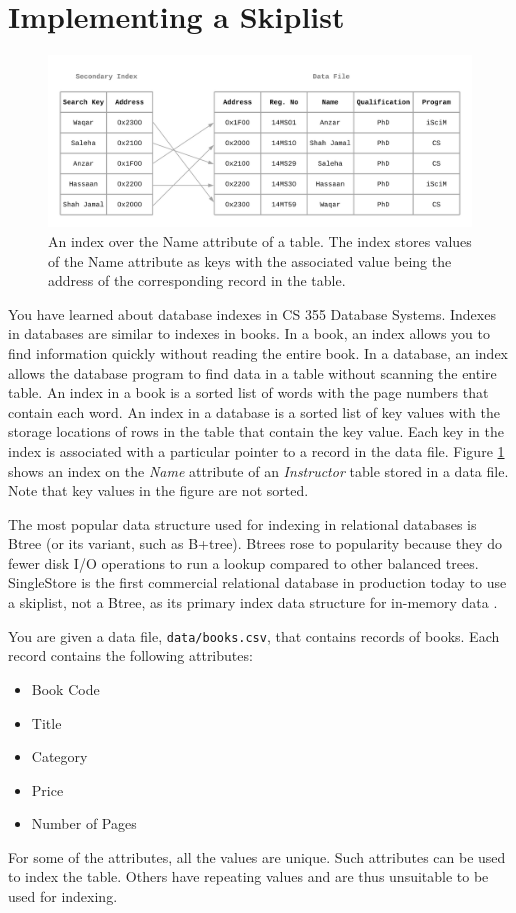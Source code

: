 \documentclass[addpoints]{exam}
\begin{document}
\newpage
\part{Implementing a Skiplist}

\begin{figure}[!h]
  \centering
  \includegraphics[width=.8\linewidth]{index}
  \caption{An index over the Name attribute of a table. The index stores values of the Name attribute as keys with the associated value being the address of the corresponding record in the table.}
  \label{fig:index}
\end{figure}

You have learned about database indexes in CS 355 Database Systems. Indexes in databases are similar to indexes in books. In a book, an index allows you to find information quickly without reading the entire book. In a database, an index allows the database program to find data in a table without scanning the entire table. An index in a book is a sorted list of words with the page numbers that contain each word. An index in a database is a sorted list of key values with the storage locations of rows in the table that contain the key value. Each key in the index is associated with a particular pointer to a record in the data file. Figure \ref{fig:index} shows an index on the \textit{Name} attribute of an \textit{Instructor} table stored in a data file. Note that key values in the figure are not sorted.
 
The most popular data structure used for indexing in relational databases is Btree (or its variant, such as B+tree). Btrees rose to popularity because they do fewer disk I/O operations to run a lookup compared to other balanced trees. SingleStore is the first commercial relational database in production today to use a skiplist, not a Btree, as its primary index data structure for in-memory data \cite{singlestore}.

You are given a data file, \texttt{data/books.csv}, that contains records of books. Each record contains the following attributes:
\begin{itemize}
\item Book Code
\item Title
\item Category
\item Price
\item Number of Pages
\end{itemize}
For some of the attributes, all the values are unique. Such attributes can be used to index the table. Others have repeating values and are thus unsuitable to be used for indexing.
\end{document}
